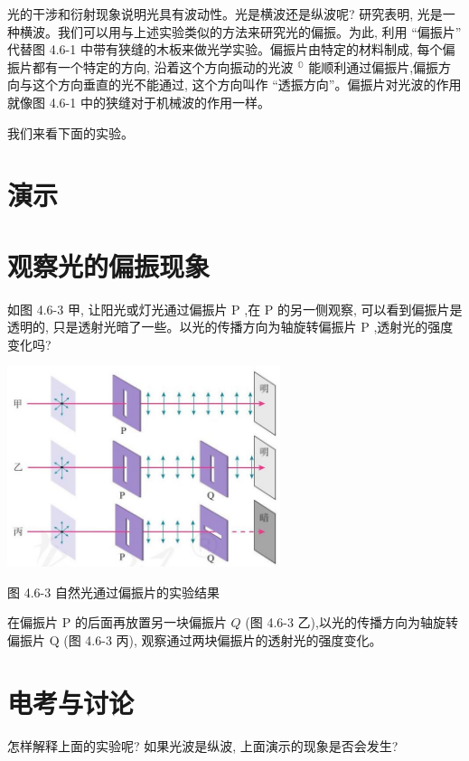 \documentclass[10pt]{article}
\begin{document}
光的干涉和衍射现象说明光具有波动性。光是横波还是纵波呢? 研究表明, 光是一种横波。我们可以用与上述实验类似的方法来研究光的偏振。为此, 利用 “偏振片” 代替图 4.6-1 中带有狭缝的木板来做光学实验。偏振片由特定的材料制成, 每个偏振片都有一个特定的方向, 沿着这个方向振动的光波 \({}^{\mathbb{O}}\) 能顺利通过偏振片,偏振方向与这个方向垂直的光不能通过, 这个方向叫作 “透振方向”。偏振片对光波的作用就像图 4.6-1 中的狭缝对于机械波的作用一样。

我们来看下面的实验。

\section*{演示}

\section*{观察光的偏振现象}

如图 4.6-3 甲, 让阳光或灯光通过偏振片 \(\mathrm{P}\) ,在 \(\mathrm{P}\) 的另一侧观察, 可以看到偏振片是透明的, 只是透射光暗了一些。以光的传播方向为轴旋转偏振片 \(\mathrm{P}\) ,透射光的强度变化吗?

\begin{center}
\includegraphics[max width=0.6\textwidth]{images/01910e4c-ebb8-7d2c-8f2f-2375bc1d2d12_114_187052.jpg}
\end{center}

图 4.6-3 自然光通过偏振片的实验结果

在偏振片 \(\mathrm{P}\) 的后面再放置另一块偏振片 \(Q\) (图 4.6-3 乙),以光的传播方向为轴旋转偏振片 \(\mathrm{Q}\) (图 4.6-3 丙), 观察通过两块偏振片的透射光的强度变化。

\section*{电考与讨论}

怎样解释上面的实验呢? 如果光波是纵波, 上面演示的现象是否会发生?
\end{document}
